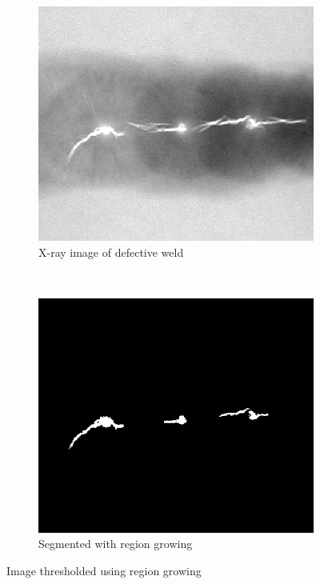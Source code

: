 \documentclass[]{article}
\begin{document}
\begin{figure}[H]
    \centering
    \begin{subfigure}{0.45\textwidth}
        \centering
        \includegraphics[width=\textwidth]{img/before/defective-weld}
        \caption{X-ray image of defective weld}
    \end{subfigure}%
    ~
    \begin{subfigure}{0.45\textwidth}
        \centering
        \includegraphics[width=\textwidth]{img/defective-weld-segmented}
        \caption{Segmented with region growing}
    \end{subfigure}%
    \caption{Image thresholded using region growing}
    \label{fig:region_growing}
\end{figure}
\end{document}
